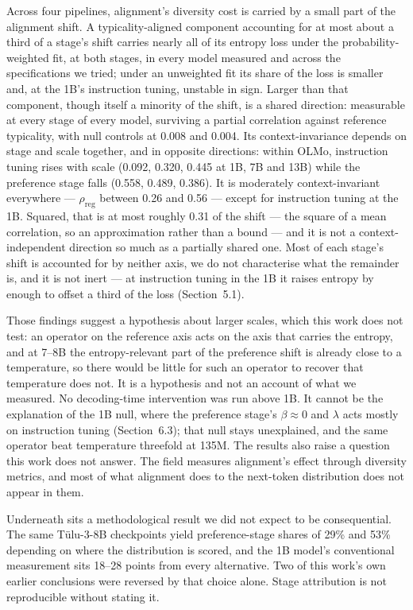 \documentclass[11pt]{article}
\newcommand{\rreg}{\rho_{\mathrm{reg}}}
\begin{document}
Across four pipelines, alignment's diversity cost is carried by a small part of the
alignment shift. A typicality-aligned component accounting for at most about a
third of a stage's shift carries nearly all of its entropy loss under the
probability-weighted fit, at both stages, in every model measured and across the
specifications we tried; under an unweighted fit its share of the loss is smaller
and, at the 1B's instruction tuning, unstable in sign. Larger
than that component, though itself a minority of the shift, is a shared direction:
measurable at every stage of every model, surviving a partial correlation against
reference typicality, with null controls at 0.008 and 0.004. Its context-invariance
depends on stage and scale together, and in opposite directions: within OLMo,
instruction tuning rises with scale (0.092, 0.320, 0.445 at 1B, 7B and 13B) while
the preference stage falls (0.558, 0.489, 0.386). It is moderately
context-invariant everywhere --- $\rreg$ between 0.26 and 0.56 --- except for
instruction tuning at the 1B. Squared, that is at most roughly 0.31 of the shift ---
the square of a mean correlation, so an approximation rather than a bound --- and it is
not a context-independent direction so much as a partially shared one. Most of each
stage's shift is accounted for by neither axis, we do not characterise what the
remainder is, and it is not inert --- at instruction tuning in the 1B it raises
entropy by enough to offset a third of the loss (Section~5.1).

Those findings suggest a hypothesis about larger scales, which this work does not
test: an operator on the reference axis acts on the axis that carries the entropy,
and at 7--8B the entropy-relevant part of the preference shift is already close to a
temperature, so there would be little for such an operator to recover that
temperature does not. It is a hypothesis and not an account of what we measured. No
decoding-time intervention was run above 1B. It cannot be the explanation of the 1B
null, where the preference stage's $\beta \approx 0$ and $\lambda$ acts mostly on
instruction tuning (Section~6.3); that null stays unexplained, and the same operator
beat temperature threefold at 135M. The results also raise a
question this work does not answer. The field measures alignment's effect through
diversity metrics, and most of what alignment does to the next-token distribution
does not appear in them.

Underneath sits a methodological result we did not expect to be consequential. The
same T\"ulu-3-8B checkpoints yield preference-stage shares of 29\% and 53\%
depending on where the distribution is scored, and the 1B model's conventional
measurement sits 18--28 points from every alternative. Two of this work's own
earlier conclusions were reversed by that choice alone. Stage attribution is not
reproducible without stating it.
\end{document}
